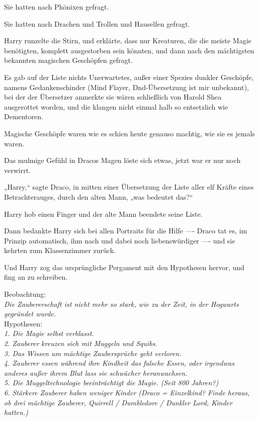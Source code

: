 {Sie hatten nach Phönixen gefragt.

Sie hatten nach Drachen und Trollen und Hauselfen gefragt.

Harry runzelte die Stirn, und erklärte, dass nur Kreaturen, die die meiste Magie benötigten, komplett ausgestorben sein könnten, und dann nach den mächtigsten bekannten magischen Geschöpfen gefragt.

Es gab auf der Liste nichts Unerwartetes, außer einer Spezies dunkler Geschöpfe, namens Gedankenschinder (Mind Flayer, Dnd-Übersetzung ist mir unbekannt), bei der der Übersetzer anmerkte sie wären schließlich von Harold Shea ausgerottet worden, und die klangen nicht einmal halb so entsetzlich wie Dementoren.

Magische Geschöpfe waren wie es schien heute genauso machtig, wie sie es jemals waren.

Das mulmige Gefühl in Dracos Magen löste sich etwas, jetzt war er nur noch verwirrt.

„Harry,“ sagte Draco, in mitten einer Übersetzung der Liste aller elf Kräfte eines Betrachterauges, durch den alten Mann, „was bedeutet das?“

Harry hob einen Finger und der alte Mann beendete seine Liste.

Dann bedankte Harry sich bei allen Portraits für die Hilfe ---- Draco tat es, im Prinzip automatisch, ihm nach und dabei noch liebenswürdiger ---- und sie kehrten zum Klassenzimmer zurück.

Und Harry zog das ursprüngliche Pergament mit den Hypothesen hervor, und fing an zu schreiben.

Beobachtung:\\ \emph{Die Zaubererschaft ist nicht mehr so stark, wie zu der Zeit, in der Hogwarts gegründet wurde.}\\

Hypothesen:\\ \emph{1. Die Magie selbst verblasst.}\\ \emph{2. Zauberer} \emph{kreuzen sich mit Muggeln und Squibs.}\\ \emph{3. Das Wissen um mächtige Zaubersprüche geht verloren.}\\ \emph{4. Zauberer essen während ihre Kindheit das falsche Essen, oder irgendwas anderes außer ihrem Blut lass sie schwächer heranwachsen.}\\ \emph{5. Die Muggeltechnologie beeinträchtigt die Magie. (Seit 800 Jahren?)}\\ \emph{6. Stärkere Zauberer haben weniger Kinder (Draco = Einzelkind? Finde heraus, ob drei mächtige Zauberer, Quirrell / Dumbledore / Dunkler Lord, Kinder hatten.)}

}
